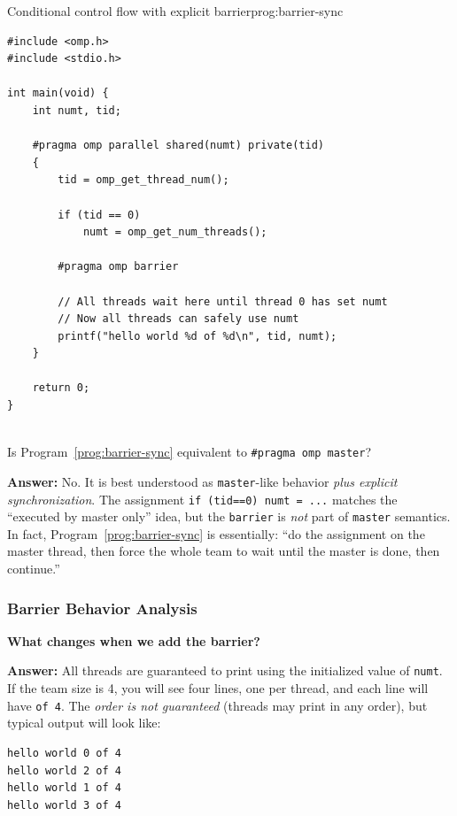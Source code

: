 \begin{ppprogram}{Conditional control flow with explicit barrier}{prog:barrier-sync}
\begin{lstlisting}[language=OpenMP]
#include <omp.h>
#include <stdio.h>

int main(void) {
    int numt, tid;

    #pragma omp parallel shared(numt) private(tid)
    {
        tid = omp_get_thread_num();

        if (tid == 0)
            numt = omp_get_num_threads();

        #pragma omp barrier

        // All threads wait here until thread 0 has set numt
        // Now all threads can safely use numt
        printf("hello world %d of %d\n", tid, numt);
    }

    return 0;
}
\end{lstlisting}
\end{ppprogram}

\begin{ppquestion}
\\ Is Program~\ref{prog:barrier-sync} equivalent to \texttt{\#pragma omp master}?

\textbf{Answer:} No. It is best understood as \texttt{master}-like behavior \emph{plus explicit synchronization}. The assignment \texttt{if (tid==0) numt = ...} matches the ``executed by master only'' idea, but the \texttt{barrier} is \emph{not} part of \texttt{master} semantics. In fact, Program~\ref{prog:barrier-sync} is essentially: ``do the assignment on the master thread, then force the whole team to wait until the master is done, then continue.''
\end{ppquestion}

\subsubsection{Barrier Behavior Analysis}

\begin{ppquestion}
\textbf{What changes when we add the barrier?}

\textbf{Answer:} All threads are guaranteed to print using the initialized value of \texttt{numt}.
If the team size is 4, you will see four lines, one per thread, and each line will have \texttt{of 4}.
The \emph{order is not guaranteed} (threads may print in any order), but typical output will look like:
\begin{verbatim}
hello world 0 of 4
hello world 2 of 4
hello world 1 of 4
hello world 3 of 4
\end{verbatim}
\end{ppquestion}

